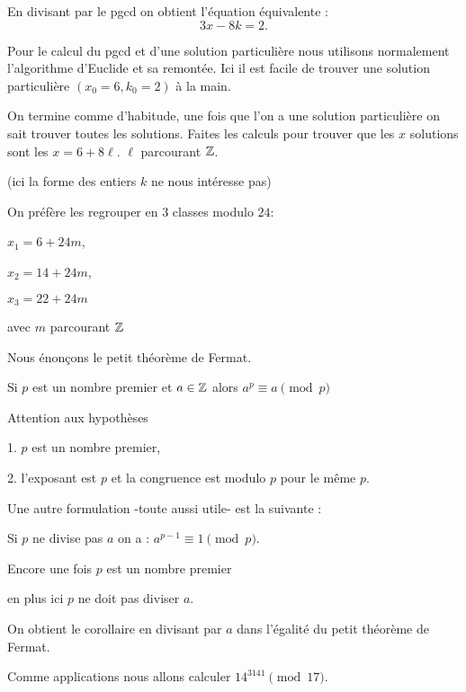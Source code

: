 \change

En divisant par le pgcd on obtient l'équation équivalente :
 $$3x-8k=2.$$

\change


Pour le calcul du pgcd et d'une solution particulière nous utilisons normalement l'algorithme d'Euclide et sa remontée.
Ici il est facile de trouver une solution particulière $(x_0=6,k_0=2)$ à la main.

\change

On termine comme d'habitude, une fois que l'on a une solution particulière on sait
trouver toutes les solutions. Faites les calculs
pour trouver que les $x$ solutions sont les  $x=6+ 8\ell$. $\ell$ parcourant $\mathbb{Z}$.

(ici la forme des entiers $k$ ne nous intéresse pas)

\change

On préfère les regrouper en $3$ classes modulo $24$:

$x_1 = 6 + 24 m$, 

$x_2 = 14 + 24 m$,

$x_3=22+24m$

 avec $m$ parcourant $\mathbb{Z}$



\diapo

Nous énonçons le petit théorème de Fermat.

Si $p$ est un nombre premier et $a \in \mathbb{Z}$ alors
$a^p \equiv a \pmod p$

Attention aux hypothèses 

1. $p$ est un nombre premier, 

2. l'exposant est $p$ et la congruence est modulo $p$
pour le même $p$.


\change

Une autre formulation -toute aussi utile-
est la suivante :

Si $p$ ne divise pas $a$ on a :
$a^{p-1} \equiv 1 \pmod p$.

Encore une fois $p$ est un nombre premier 

en plus ici $p$ ne doit pas diviser $a$.

On obtient le corollaire en divisant par $a$ dans l'égalité du petit théorème de Fermat.


\diapo

Comme applications nous allons calculer $14^{3141} \pmod {17}$.

